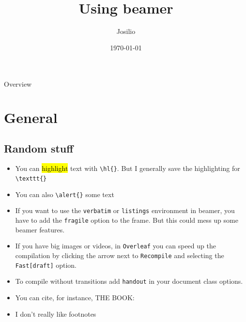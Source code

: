 \documentclass[aspectratio=1610,11pt]{beamer}
\title[beamer stuff]{Using beamer}
\author{Josilio}
\date{\today}
\institute{KTH Mechanics}
\begin{document}
\startpage
\begin{frame}[noframenumbering]

  \maketitle

\end{frame}


\normalpageline


\begin{frame}{Overview}
\tableofcontents
\end{frame}

\section{General}
\subsection{Random stuff}
\begin{frame}[fragile]{\insertsection}
    \begin{itemize}
    \item You can \hl{highlight} text with \verb|\hl{}|. But I generally save the highlighting for \verb|\texttt{}|
    \item You can also \verb|\alert{}| some \alert{text}
    \item If you want to use the \texttt{verbatim} or \texttt{listings} environment in beamer, you have to add the \texttt{fragile} option to the frame. But this could mess up some beamer features.
    \item If you have big images or videos, in \texttt{Overleaf} you can speed up the compilation by clicking the arrow next to \texttt{Recompile} and selecting the \texttt{Fast[draft]} option. 
    \item To compile without transitions add \texttt{handout} in your document class options.
    \item You can cite, for instance, THE BOOK: \cite{schmid2002stability}

    \item I don't really like footnotes\footnotemark[1]
    
    \end{itemize}
\end{frame}
\end{document}
